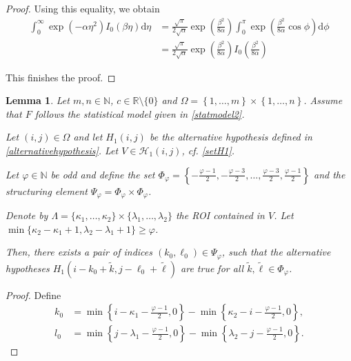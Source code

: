 \documentclass[a4paper,12pt]{article}
\theoremstyle{plain}
\newtheorem{lemma}[theorem]{Lemma}
\theoremstyle{definition}
\numberwithin{equation}{section}
\begin{document}
\begin{appendix}
\begin{proof}
		Using this equality, we obtain
		\begin{align*}
			\int_0^\infty \exp \left( - \alpha \eta^2 \right) I_0 ( \beta \eta ) \mathrm{d}\eta &= \frac{\sqrt{\pi}}{2 \sqrt{\alpha}} \exp \left( \frac{\beta^2}{8 \alpha} \right) \int_0^\pi \exp \left( \frac{\beta^2}{8 \alpha} \cos \phi \right) \mathrm{d}\phi \\
			&= \frac{\sqrt{\pi}}{2 \sqrt{\alpha}} \exp \left( \frac{\beta^2}{8 \alpha} \right) I_0 \left( \frac{\beta^2}{8 \alpha} \right)
		\end{align*}
		
		This finishes the proof.
	\end{proof}
	
	\newpage
	
	\begin{lemma}\label{lem: indices}
		Let $m, n \in \mathbb{N}$, $c \in \mathbb{R} \setminus \{ 0 \}$ and $\Omega = \left\{ 1, \dots, m \right\} \times \left\{ 1, \dots, n \right\}$. Assume that $F$ follows the statistical model given in \eqref{statmodel2}.
		
		Let $(i, j) \in \Omega$ and let $H_1(i, j)$ be the alternative hypothesis defined in \eqref{alternativehypothesis}. Let $V \in \mathcal{H}_1(i, j)$, cf. \eqref{setH1}.
		
		Let $\varphi \in \mathbb{N}$ be odd and define the set $\Phi_\varphi = \left\{ -\frac{\varphi - 1}{2}, -\frac{\varphi - 3}{2}, \dots, \frac{\varphi - 3}{2}, \frac{\varphi - 1}{2} \right\}$ and the structuring element $\Psi_\varphi = \Phi_\varphi \times \Phi_\varphi$.
		
		Denote by $\varLambda = \{ \kappa_1, \dots, \kappa_2 \} \times \{ \lambda_1, \dots, \lambda_2 \}$ the ROI contained in $V$. Let $\min \{ \kappa_2 - \kappa_1 + 1, \lambda_2 - \lambda_1 + 1 \} \geq \varphi$.
		
		Then, there exists a pair of indices $(k_0, \ell_0) \in \Psi_\varphi$, such that the alternative hypotheses $H_1(i - k_0 + \tilde{k}, j - \ell_0 + \tilde{\ell})$ are true for all $\tilde{k}, \tilde{\ell} \in \Phi_\varphi$.
	\end{lemma}
	\begin{proof}
		Define
		\begin{align*}
			k_0 &= \min \left\{ i - \kappa_1 - \frac{\varphi - 1}{2}, 0 \right\} - \min \left\{ \kappa_2 - i - \frac{\varphi - 1}{2}, 0 \right\}, \\
			l_0 &= \min \left\{ j - \lambda_1 - \frac{\varphi - 1}{2}, 0 \right\} - \min \left\{ \lambda_2 - j - \frac{\varphi - 1}{2}, 0 \right\}.
		\end{align*}
		

\end{proof}
\end{appendix}
\end{document}
